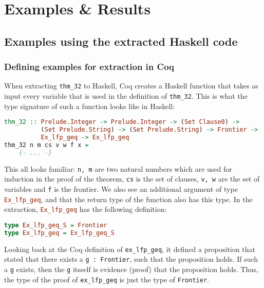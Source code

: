 \chapter{Examples \& Results}

\section{Examples using the extracted Haskell code}

\subsection{Defining examples for extraction in Coq}

When extracting \lstinline{thm_32} to Haskell, Coq
creates a Haskell function that takes as input every variable
that is used in the definition of \lstinline{thm_32}.
This is what the type signature of such a function looks like in Haskell:

\begin{minipage}{\linewidth}
\begin{lstlisting}[language=Haskell, label={lst:thm_32_haskell}, caption={Haskell extraction of \lstinline{thm_32}}]
thm_32 :: Prelude.Integer -> Prelude.Integer -> (Set Clause0) ->
          (Set Prelude.String) -> (Set Prelude.String) -> Frontier ->
          Ex_lfp_geq -> Ex_lfp_geq
thm_32 n m cs v w f x =
    {- ... -}
\end{lstlisting}
\end{minipage}

This all looks familiar: \lstinline{n, m} are two natural numbers which are used for induction in the proof of the theorem,
\lstinline{cs} is the set of clauses, \lstinline{v, w} are the set of variables
and \lstinline{f} is the frontier.
We also see an additional argument of type \lstinline[language=Haskell]{Ex_lfp_geq}, and that the return type
of the function also has this type.
In the extraction, \lstinline[language=Haskell]{Ex_lfp_geq} has the following definition:

\begin{minipage}{\linewidth}
\begin{lstlisting}[language=Haskell, label={lst:ex_lfp_geq_haskell}, caption={\lstinline{Ex_lfp_geq} in Haskell}]
type Ex_lfp_geq_S = Frontier
type Ex_lfp_geq = Ex_lfp_geq_S
\end{lstlisting}
\end{minipage}

Looking back at the Coq definition of \lstinline{ex_lfp_geq}, it defined a proposition that stated that there
exists a \lstinline{g : Frontier}, such that the proposition holds.
If such a \lstinline{g} exists, then the \lstinline{g} itsself is evidence (proof) that the proposition holds.
Thus, the type of the proof of \lstinline{ex_lfp_geq} is just the type of \lstinline{Frontier}.

